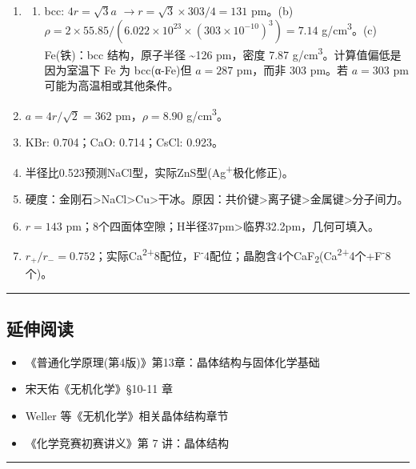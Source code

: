 \documentclass[a4paper,11pt]{ctexart}
\providecommand{\tightlist}{\setlength{\itemsep}{0pt}\setlength{\parskip}{0pt}}
\newcommand{\箭}{\ensuremath{\rightarrow}}
\newcommand{\左箭}{\ensuremath{\leftarrow}}
\newcommand{\上箭}{\ensuremath{\uparrow}}
\newcommand{\下箭}{\ensuremath{\downarrow}}
\newcommand{\衡}{\ensuremath{\rightleftharpoons}}
\newcommand{\双箭}{\ensuremath{\leftrightarrow}}
\newcommand{\约等于}{\ensuremath{\approx}}
\newcommand{\小于等于}{\ensuremath{\leq}}
\newcommand{\大于等于}{\ensuremath{\geq}}
\newcommand{\不等于}{\ensuremath{\neq}}
\newcommand{\西格马}{\ensuremath{\sigma}}
\newcommand{\派}{\ensuremath{\pi}}
\begin{document}
\begin{enumerate}
\begin{enumerate}
  \end{enumerate}
\item
  \begin{enumerate}
  \def\labelenumii{(\alph{enumii})}
  \tightlist
  \item
    bcc: \(4r = \sqrt{3}a\) \箭 \(r = \sqrt{3}\times303/4 = 131\) pm。(b) \(\rho = 2\times55.85/(6.022\times10^{23}\times(303\times10^{-10})^3) = 7.14\) g/cm\textsuperscript{3}。(c) Fe(铁)：bcc 结构，原子半径 \textasciitilde126 pm，密度 7.87 g/cm\textsuperscript{3}。计算值偏低是因为室温下 Fe 为 bcc(α-Fe)但 \(a=287\) pm，而非 303 pm。若 \(a=303\) pm 可能为高温相或其他条件。
  \end{enumerate}
\item
  \(a=4r/\sqrt{2}=362\) pm，\(\rho=8.90\) g/cm\textsuperscript{3}。
\item
  KBr: 0.704；CaO: 0.714；CsCl: 0.923。
\item
  半径比0.523预测NaCl型，实际ZnS型(Ag\textsuperscript{+}极化修正)。
\item
  硬度：金刚石\textgreater NaCl\textgreater Cu\textgreater 干冰。原因：共价键\textgreater 离子键\textgreater 金属键\textgreater 分子间力。
\item
  \(r=143\) pm；8个四面体空隙；H半径37pm\textgreater 临界32.2pm，几何可填入。
\item
  \(r_+/r_-=0.752\)；实际Ca\textsuperscript{2+}8配位，F\textsuperscript{-}4配位；晶胞含4个CaF\textsubscript{2}(Ca\textsuperscript{2+}4个+F\textsuperscript{-}8个)。
\end{enumerate}

\begin{center}\rule{0.5\linewidth}{0.5pt}\end{center}

\subsection{延伸阅读}\label{ux5ef6ux4f38ux9605ux8bfb}

\begin{itemize}
\tightlist
\item
  《普通化学原理(第4版)》第13章：晶体结构与固体化学基础
\item
  宋天佑《无机化学》§10-11 章
\item
  Weller 等《无机化学》相关晶体结构章节
\item
  《化学竞赛初赛讲义》第 7 讲：晶体结构
\end{itemize}

\begin{center}\rule{0.5\linewidth}{0.5pt}\end{center}
\end{document}
